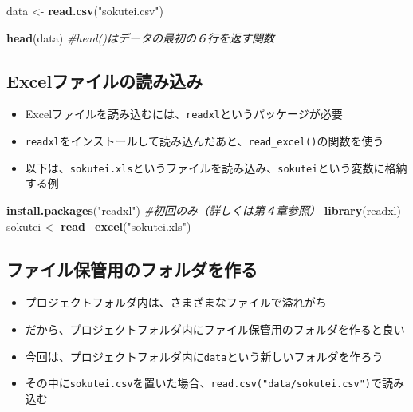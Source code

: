 \documentclass[
]{book}
\newenvironment{Shaded}{\begin{snugshade}}{\end{snugshade}}
\newcommand{\CommentTok}[1]{\textcolor[rgb]{0.56,0.35,0.01}{\textit{#1}}}
\newcommand{\FunctionTok}[1]{\textcolor[rgb]{0.13,0.29,0.53}{\textbf{#1}}}
\newcommand{\NormalTok}[1]{#1}
\newcommand{\OtherTok}[1]{\textcolor[rgb]{0.56,0.35,0.01}{#1}}
\newcommand{\StringTok}[1]{\textcolor[rgb]{0.31,0.60,0.02}{#1}}
\providecommand{\tightlist}{%
  \setlength{\itemsep}{0pt}\setlength{\parskip}{0pt}}
\begin{document}
\begin{Shaded}
\begin{Highlighting}[]
\NormalTok{data }\OtherTok{\textless{}{-}} \FunctionTok{read.csv}\NormalTok{(}\StringTok{"sokutei.csv"}\NormalTok{)}

\FunctionTok{head}\NormalTok{(data) }\CommentTok{\#head()はデータの最初の６行を返す関数}
\end{Highlighting}
\end{Shaded}

\hypertarget{excelux30d5ux30a1ux30a4ux30ebux306eux8aadux307fux8fbcux307f}{%
\subsection{Excelファイルの読み込み}\label{excelux30d5ux30a1ux30a4ux30ebux306eux8aadux307fux8fbcux307f}}

\begin{itemize}
\tightlist
\item
  Excelファイルを読み込むには、\texttt{readxl}というパッケージが必要
\item
  \texttt{readxl}をインストールして読み込んだあと、\texttt{read\_excel()}の関数を使う
\item
  以下は、\texttt{sokutei.xls}というファイルを読み込み、\texttt{sokutei}という変数に格納する例
\end{itemize}

\begin{Shaded}
\begin{Highlighting}[]
\FunctionTok{install.packages}\NormalTok{(}\StringTok{"readxl"}\NormalTok{) }\CommentTok{\#初回のみ（詳しくは第４章参照）}
\FunctionTok{library}\NormalTok{(readxl)}
\NormalTok{sokutei }\OtherTok{\textless{}{-}} \FunctionTok{read\_excel}\NormalTok{(}\StringTok{"sokutei.xls"}\NormalTok{)}
\end{Highlighting}
\end{Shaded}

\hypertarget{ux30d5ux30a1ux30a4ux30ebux4fddux7ba1ux7528ux306eux30d5ux30a9ux30ebux30c0ux3092ux4f5cux308b}{%
\subsection{ファイル保管用のフォルダを作る}\label{ux30d5ux30a1ux30a4ux30ebux4fddux7ba1ux7528ux306eux30d5ux30a9ux30ebux30c0ux3092ux4f5cux308b}}

\begin{itemize}
\tightlist
\item
  プロジェクトフォルダ内は、さまざまなファイルで溢れがち
\item
  だから、プロジェクトフォルダ内にファイル保管用のフォルダを作ると良い
\item
  今回は、プロジェクトフォルダ内に\texttt{data}という新しいフォルダを作ろう
\item
  その中に\texttt{sokutei.csv}を置いた場合、\texttt{read.csv("data/sokutei.csv")}で読み込む
\end{itemize}
\end{document}
